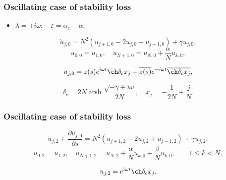 \documentclass[fullscreen=true, unicode, bookmarks=false]{beamer}
\DeclareMathOperator{\arsh}{arsh}
\begin{document}
\begin{frame}
\frametitle{ Oscillating case of stability loss }

\begin{itemize}
\item { $ \lambda = \pm i \omega: \quad \varepsilon=\alpha_c-\alpha, $
}
\end{itemize}

\bigskip

\begin{equation}
	\dot u_{j,0} = N^2(u_{j+1,0} - 2u_{j,0} + u_{j-1,0}) + \gamma u_{j,0},
\end{equation}
\begin{equation}
	u_{0,0} = u_{1,0}, \quad u_{N+1,0} = u_{N,0} + \dfrac{\alpha}{N}u_{k,0},
\end{equation}

\bigskip

$$ u_{j,0} = z(s) e^{i \omega t} \ch \delta_c x_j + \overline{z(s)} e^{-i \omega t} \overline{\ch \delta_c x_j}, $$

$$ \delta_c = 2N \arsh \dfrac{\sqrt{-\gamma + i \omega}}{2N}, \quad x_j = -\dfrac{1}{2N} + \dfrac{j}{N}. $$

\end{frame}

\begin{frame}
\frametitle{ Oscillating case of stability loss }

\begin{equation}
	\dot u_{j,2} + \frac{\partial u_{j,0}}{\partial s} = N^2(u_{j+1,2} - 2u_{j,2} + u_{j-1,2}) + \gamma u_{j,2},
\end{equation}
\begin{equation}
	u_{0,2} = u_{1,2}, \quad u_{N+1,2} = u_{N,2} + \dfrac{\alpha}{N}u_{k,0} + \dfrac{\beta}{N}u_{k,0}, \qquad 1 \le k < N,
\end{equation}

\bigskip

$$ u_{j,2} = e^{i \omega t} \ch \delta_c x_j. $$

\end{frame}
\end{document}
